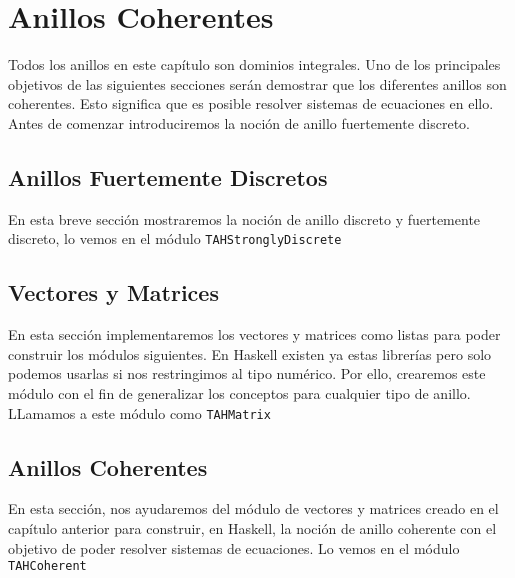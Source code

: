 \chapter{Anillos Coherentes}\label{sec:coherentHas}
Todos los anillos en este capítulo son dominios integrales. Uno de los principales objetivos de las siguientes secciones serán demostrar que los diferentes anillos son coherentes. Esto significa que es posible resolver sistemas de ecuaciones en ello. Antes de comenzar introduciremos la noción de anillo fuertemente discreto.
\section{Anillos Fuertemente Discretos}
En esta breve sección mostraremos la noción de anillo discreto y fuertemente discreto, lo vemos en el módulo \texttt{TAHStronglyDiscrete} 

\section{Vectores y Matrices}
En esta sección implementaremos los vectores y matrices como listas para poder construir los módulos siguientes. En Haskell existen ya estas librerías pero solo podemos usarlas si nos restringimos al tipo numérico. Por ello, crearemos este módulo con el fin de generalizar los conceptos para cualquier tipo de anillo. LLamamos a este módulo como \texttt{TAHMatrix}

\section{Anillos Coherentes}
En esta sección, nos ayudaremos del módulo de vectores y matrices creado en el capítulo anterior para construir, en Haskell, la noción de anillo coherente con el objetivo de poder resolver sistemas de ecuaciones. Lo vemos en el módulo \texttt{TAHCoherent} 
